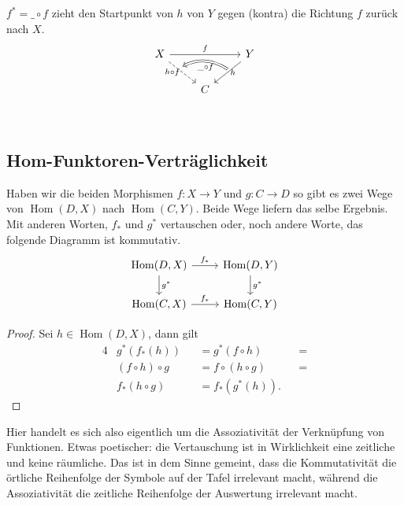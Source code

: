 \documentclass[a4paper]{amsart}
\theoremstyle{definition}
\DeclareMathOperator{\Hom}{Hom}
\begin{document}
$f^* = \_ \circ f$ zieht den Startpunkt von $h$ von $Y$ gegen (kontra) die Richtung $f$ zurück nach $X$.
\begin{equation}
   \begin{tikzcd}
      X \arrow[rr, "f"{above}] \arrow[dr, dashed, "h \circ f"{left, name=1}] &
                            &Y \arrow[dl, , "h"{right,name=0}]\\
      &C     \\
      \arrow[Rightarrow, bend right, from=0, to=1, "\_ \circ f"{below}]
   \end{tikzcd}
\end{equation}

\subsection{Hom-Funktoren-Verträglichkeit}
Haben wir die beiden Morphismen $f \colon X \to Y$ und $g \colon C \to D$ so gibt es zwei Wege von $\Hom(D,X)$ nach $\Hom(C,Y)$. Beide Wege liefern das selbe Ergebnis. Mit anderen Worten, $f_*$ und $g^*$ vertauschen oder, noch andere Worte, das folgende Diagramm ist kommutativ.
\begin{equation}
   \begin{tikzcd}
      \Hom(D,X)   \arrow[d, "g^*"]  \arrow[r, "f_*"] & \Hom(D,Y) \arrow[d, "g^*"]\\
      \Hom(C,X)                     \arrow[r, "f_*"] & \Hom(C,Y)
   \end{tikzcd}
\end{equation}
\begin{proof}
   Sei $h\in \Hom(D,X)$, dann gilt
   \begin{alignat}{4}
      &g^*(f_*(h))         &&= g^*(f \circ h)      &&= \\
      &(f \circ h) \circ g &&= f \circ (h \circ g) &&=\\
      &f_*(h \circ g)      &&= f_*(g^*(h)).
   \end{alignat}
\end{proof}
Hier handelt es sich also eigentlich um die Assoziativität der Verknüpfung von Funktionen. Etwas poetischer: die Vertauschung ist in Wirklichkeit eine zeitliche und keine räumliche. Das ist in dem Sinne gemeint, dass die Kommutativität die örtliche Reihenfolge der Symbole auf der Tafel irrelevant macht, während die Assoziativität die zeitliche Reihenfolge der Auswertung irrelevant macht.
\end{document}
